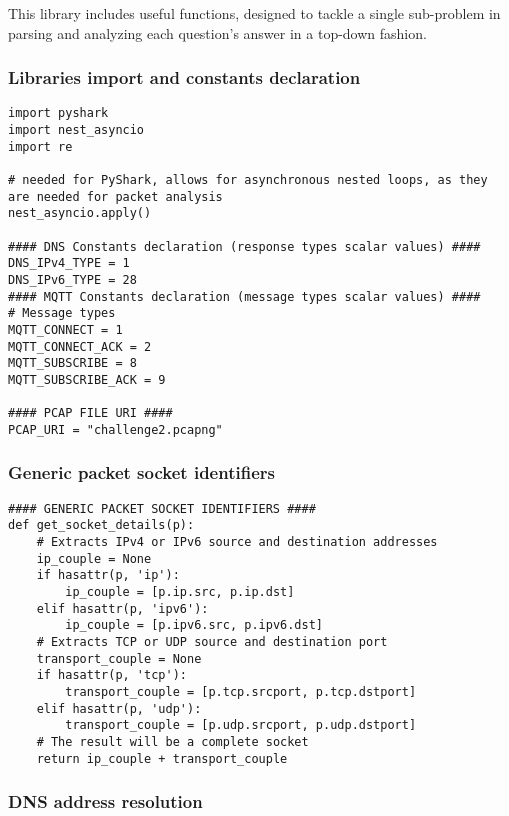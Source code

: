 \documentclass[a4paper,11pt]{article} %
\begin{document}
    This library includes useful functions, designed to tackle a single sub-problem in parsing and analyzing each question's answer in a top-down fashion.

    \subsubsection{Libraries import and constants declaration}
    \begin{verbatim}
import pyshark
import nest_asyncio
import re

# needed for PyShark, allows for asynchronous nested loops, as they are needed for packet analysis
nest_asyncio.apply()

#### DNS Constants declaration (response types scalar values) ####
DNS_IPv4_TYPE = 1
DNS_IPv6_TYPE = 28
#### MQTT Constants declaration (message types scalar values) ####
# Message types
MQTT_CONNECT = 1
MQTT_CONNECT_ACK = 2
MQTT_SUBSCRIBE = 8
MQTT_SUBSCRIBE_ACK = 9

#### PCAP FILE URI ####
PCAP_URI = "challenge2.pcapng"
    \end{verbatim}

    \subsubsection{Generic packet socket identifiers}
    \begin{verbatim}
#### GENERIC PACKET SOCKET IDENTIFIERS ####
def get_socket_details(p):
    # Extracts IPv4 or IPv6 source and destination addresses
    ip_couple = None
    if hasattr(p, 'ip'):
        ip_couple = [p.ip.src, p.ip.dst]
    elif hasattr(p, 'ipv6'):
        ip_couple = [p.ipv6.src, p.ipv6.dst]
    # Extracts TCP or UDP source and destination port
    transport_couple = None
    if hasattr(p, 'tcp'):
        transport_couple = [p.tcp.srcport, p.tcp.dstport]
    elif hasattr(p, 'udp'):
        transport_couple = [p.udp.srcport, p.udp.dstport]
    # The result will be a complete socket
    return ip_couple + transport_couple
    \end{verbatim}

    \subsubsection{DNS address resolution}
    \label{subsubsec:dns-resolution-python}
\end{document}
